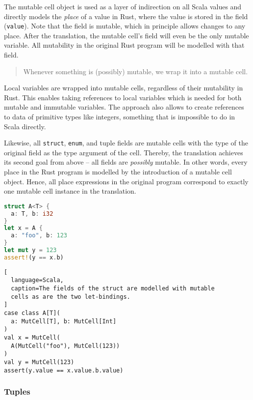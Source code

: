 The mutable cell object is used as a layer of indirection on all Scala values
and directly models the \emph{place} of a value in Rust, where the value is
stored in the field (\lstinline!value!). Note that the field is mutable, which
in principle allows changes to any place. After the translation, the mutable
cell's field will even be the only mutable variable. All mutability in the
original Rust program will be modelled with that field.

\begin{quote}
Whenever something is (possibly) mutable, we wrap it into a mutable cell.
\end{quote}

Local variables are wrapped into mutable cells, regardless of their mutability
in Rust. This enables taking references to local variables which is needed for
both mutable and immutable variables. The approach also allows to create
references to data of primitive types like integers, something that is
impossible to do in Scala directly.

Likewise, all \lstinline!struct!, \lstinline!enum!, and tuple fields are mutable
cells with the type of the original field as the type argument of the cell.
Thereby, the translation achieves its second goal from above -- all fields are
\emph{possibly} mutable. In other words, every place in the Rust program is
modelled by the introduction of a mutable cell object. Hence, all place
expressions in the original program correspond to exactly one mutable cell
instance in the translation.

\noindent\begin{minipage}[t]{.45\textwidth}
\begin{lstlisting}[language=Rust, caption={Example Rust struct.}]
struct A<T> {
  a: T, b: i32
}
let x = A {
  a: "foo", b: 123
}
let mut y = 123
assert!(y == x.b)
\end{lstlisting}
\end{minipage}\hfill
\begin{minipage}[t]{.52\textwidth}
\begin{lstlisting}[
  language=Scala,
  caption=The fields of the struct are modelled with mutable
  cells as are the two let-bindings.
]
case class A[T](
  a: MutCell[T], b: MutCell[Int]
)
val x = MutCell(
  A(MutCell("foo"), MutCell(123))
)
val y = MutCell(123)
assert(y.value == x.value.b.value)
\end{lstlisting}
\end{minipage}


\subsubsection{Tuples}

